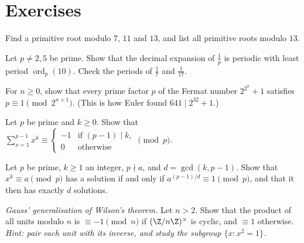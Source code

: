 \section{Exercises}

\begin{exercise}[$\star$]\label{ex:findroots}
Find a primitive root modulo $7$, $11$ and $13$, and list all primitive roots modulo $13$.
\end{exercise}

\begin{exercise}[$\star$]\label{ex:period}
Let $p\ne2,5$ be prime. Show that the decimal expansion of $\frac1p$ is periodic with least period $\operatorname{ord}_p(10)$. Check the periods of $\frac17$ and $\frac1{17}$.
\end{exercise}

\begin{exercise}[$\star\star$]\label{ex:fermatfactor}
For $n\ge0$, show that every prime factor $p$ of the Fermat number $2^{2^n}+1$ satisfies $p\equiv1\pmod{2^{n+1}}$. (This is how Euler found $641\mid2^{32}+1$.)
\end{exercise}

\begin{exercise}[$\star\star$]\label{ex:powersum}
Let $p$ be prime and $k\ge0$. Show that $\displaystyle\sum_{x=1}^{p-1}x^k\equiv\begin{cases}-1&\text{if }(p-1)\mid k,\\0&\text{otherwise}\end{cases}\pmod p$.
\end{exercise}

\begin{exercise}[$\star\star$]\label{ex:kth}
Let $p$ be prime, $k\ge1$ an integer, $p\nmid a$, and $d=\gcd(k,p-1)$. Show that $x^k\equiv a\pmod p$ has a solution if and only if $a^{(p-1)/d}\equiv1\pmod p$, and that it then has exactly $d$ solutions.
\end{exercise}

\begin{exercise}[$\star\star\star$]\label{ex:gausswilson}
\emph{Gauss' generalisation of Wilson's theorem.} Let $n>2$. Show that the product of all units modulo $n$ is $\equiv-1\pmod n$ if $(\Z/n\Z)^\times$ is cyclic, and $\equiv1$ otherwise. \emph{Hint: pair each unit with its inverse, and study the subgroup $\{x:x^2=1\}$.}
\end{exercise}

